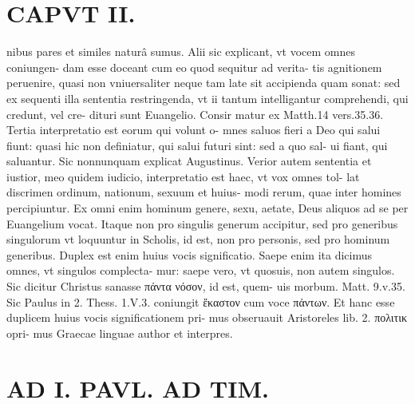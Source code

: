 \documentclass{article}
\begin{document}
\begin{pages}
\section*{CAPVT  II. }
\marginpar{[ p.55 ]}\pstart nibus pares et similes naturâ sumus. Alii sic explicant, vt vocem omnes coniungen- dam esse doceant cum eo quod sequitur ad verita- tis agnitionem peruenire, quasi non vniuersaliter neque tam late sit accipienda quam sonat: sed ex sequenti illa sententia restringenda, vt ii tantum intelligantur comprehendi, qui credunt, vel cre- dituri sunt Euangelio. Consir matur ex Matth.14 vers.35.36. Tertia interpretatio est eorum qui volunt o- mnes saluos fieri a Deo qui salui fiunt: quasi hic non definiatur, qui salui futuri sint: sed a quo sal- ui fiant, qui saluantur. Sic nonnunquam explicat Augustinus. Verior autem sententia et iustior, meo quidem iudicio, interpretatio est haec, vt vox omnes tol- lat discrimen ordinum, nationum, sexuum et huius- modi rerum, quae inter homines percipiuntur. Ex omni enim hominum genere, sexu, aetate, Deus aliquos ad se per Euangelium vocat. Itaque non pro singulis generum accipitur, sed pro generibus singulorum vt loquuntur in Scholis, id est, non pro personis, sed pro hominum generibus. Duplex est enim huius vocis significatio. Saepe enim ita dicimus omnes, vt singulos complecta- mur: saepe vero, vt quosuis, non autem singulos. Sic dicitur Christus sanasse πάντα νόσον, id est, quem- uis morbum. Matt. 9.v.35. Sic Paulus in 2. Thess. 1.V.3. coniungit ἕκαστον cum voce πἀντων. Et hanc esse duplicem huius vocis significationem pri- mus obseruauit Aristoreles lib.  2. πολιτικ opri- mus Graecae linguae author et interpres.  \pend
\section*{AD I. PAVL. AD TIM. }
\marginpar{[ p.56 ]}\pstart {}
{}

\end{pages}
\end{document}
